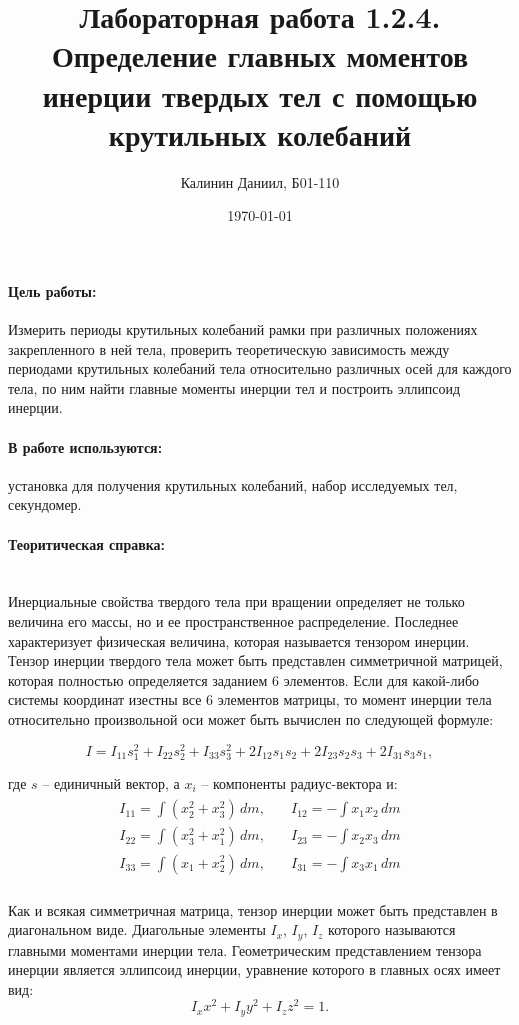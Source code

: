 \documentclass[a4paper, 12pt]{article}
\author{Калинин Даниил, Б01-110}
\date{\today}
\title{Лабораторная работа 1.2.4.\\Определение главных моментов инерции твердых тел с помощью крутильных колебаний}
\newcommand{\parag}[1]{\paragraph*{#1:}}
\begin{document}
\maketitle

\parag {Цель работы}
Измерить периоды крутильных колебаний рамки при различных положениях закрепленного в ней тела, проверить теоретическую зависимость между периодами крутильных колебаний тела относительно различных осей для каждого тела, по ним найти главные моменты инерции тел и построить эллипсоид инерции.
\parag {В работе используются}
установка для получения крутильных колебаний, набор исследуемых тел, секундомер.
\parag {Теоритическая справка} ~\\
Инерциальные свойства твердого тела при вращении определяет не только величина его массы, но и ее пространственное распределение. Последнее характеризует физическая величина, которая называется тензором инерции. Тензор инерции твердого тела может быть представлен симметричной матрицей, которая полностью определяется заданием 6 элементов. Если для какой-либо системы координат изестны все 6 элементов матрицы, то момент инерции тела относительно произвольной оси может быть вычислен по следующей формуле:

\begin{equation}
    I = I_{11}s_{1}^2 + I_{22}s_{2}^2 + I_{33}s_{3}^2 + 2I_{12}s_{1}s_{2} + 2I_{23}s_{2}s_{3} + 2I_{31}s_{3}s_{1}, 
\end{equation}

где
$s$ -- единичный вектор, а $x_i$ -- компоненты радиус-вектора и:
\begin{align}
\begin{split}
    I_{11} = \int  (x_2^2 + x_3^2) \,dm  ,\quad & I_{12} =  -\int  x_1x_2 \,dm   \\
    I_{22} = \int  (x_3^2 + x_1^2) \,dm  ,\quad & I_{23} =  -\int  x_2x_3 \,dm    \\
    I_{33} = \int  (x_1 + x_2^2) \,dm  ,\quad & I_{31} =  -\int  x_3x_1 \,dm    \\    
\end{split}
\end{align}



Как и всякая симметричная матрица, тензор инерции может быть представлен в диагональном виде. Диагольные элементы $I_x$, $I_y$, $I_z$ которого называются главными моментами инерции тела. Геометрическим представлением тензора инерции является эллипсоид инерции, уравнение которого в главных осях имеет вид:
\begin{equation}
    I_xx^2 + I_yy^2 + I_zz^2 = 1.
\end{equation}
\end{document}
